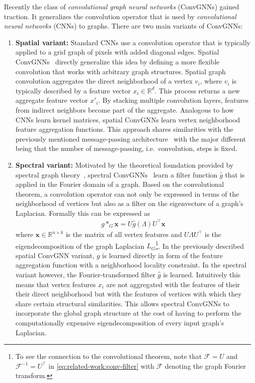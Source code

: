 \documentclass[12pt]{scrartcl}
\begin{document}
\begin{enumerate}[label=\textbf{\arabic*.}]
		Recently the class of \textit{convolutional graph neural networks} (ConvGNNs) gained traction.
		It generalizes the convolution operator that is used by \textit{convolutional neural networks} (CNNs) to graphs.
		There are two main variants of ConvGNNs:
		\begin{enumerate}[label=\textbf{\alph*)}] %
			\item \textbf{Spatial variant:}
				Standard CNNs use a convolution operator that is typically applied to a grid graph of pixels with added diagonal edges.
				Spatial ConvGNNs~\cite{Micheli2009} directly generalize this idea by defining a more flexible convolution that works with arbitrary graph structures.
				Spatial graph convolution aggregates the direct neighborhood of a vertex $v_i$, where $v_i$ is typically described by a feature vector $x_i \in \mathbb{R}^d$.
				This process returns a new aggregate feature vector $x'_i$.
				By stacking multiple convolution layers, features from indirect neighbors become part of the aggregate.
				Analogous to how CNNs learn kernel matrices, spatial ConvGNNs learn vertex neighborhood feature aggregation functions.
				This approach shares similarities with the previously mentioned message-passing architecture~\cite{Gori2005} with the major different being that the number of message-passing, i.e.\ convolution, steps is fixed.
			\item \textbf{Spectral variant:}
				Motivated by the theoretical foundation provided by spectral graph theory~\cite{Shuman2013}, spectral ConvGNNs~\cite{Bruna2013} learn a filter function $\hat{g}$ that is applied in the Fourier domain of a graph.
				Based on the convolutional theorem, a convolution operator can not only be expressed in terms of the neighborhood of vertices but also as a filter on the eigenvectors of a graph's Laplacian.
				Formally this can be expressed as
				\begin{align}
					g *_G \bm{x} = U \hat{g}(\Lambda) U^{\top} \bm{x}\label{eq:related-work:conv-filter}
				\end{align}
				where $\bm{x} \in \mathbb{R}^{n \times k}$ is the matrix of all vertex features and $U \Lambda U^{\top}$ is the eigendecomposition of the graph Laplacian $L_G$\footnote{
					To see the connection to the convolutional theorem, note that $\mathcal{F} = U$ and $\mathcal{F}^{-1} = U^{\top}$ in \cref{eq:related-work:conv-filter} with $\mathcal{F}$ denoting the graph Fourier transform.
				}.
				In the previously described spatial ConvGNN variant, $g$ is learned directly in form of the feature aggregation function with a neighborhood locality constraint.
				In the spectral variant however, the Fourier-transformed filter $\hat{g}$ is learned.
				Intuitively this means that vertex features $x_i$ are not aggregated with the features of their their direct neighborhood but with the features of vertices with which they share certain structural similarities.
				This allows spectral ConvGNNs to incorporate the global graph structure at the cost of having to perform the computationally expensive eigendecomposition of every input graph's Laplacian.


\end{enumerate}
\end{enumerate}
\end{document}
